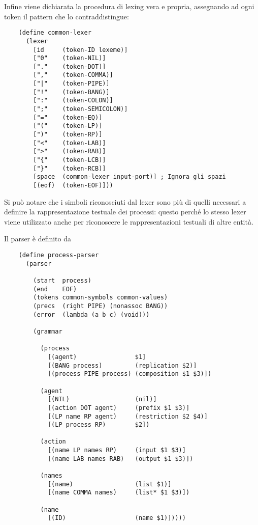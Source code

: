 Infine viene dichiarata la procedura di lexing vera e propria,
assegnando ad ogni token il pattern che lo contraddistingue:

\begin{lstlisting}
    (define common-lexer
      (lexer
        [id     (token-ID lexeme)]
        ["0"    (token-NIL)]
        ["."    (token-DOT)]
        [","    (token-COMMA)]
        ["|"    (token-PIPE)]
        ["!"    (token-BANG)]
        [":"    (token-COLON)]
        [";"    (token-SEMICOLON)]
        ["="    (token-EQ)]
        ["("    (token-LP)]
        [")"    (token-RP)]
        ["<"    (token-LAB)]
        [">"    (token-RAB)]
        ["{"    (token-LCB)]
        ["}"    (token-RCB)]
        [space  (common-lexer input-port)] ; Ignora gli spazi
        [(eof)  (token-EOF)]))
\end{lstlisting}

Si pu\`o notare che i simboli riconosciuti dal lexer sono pi\`u di
quelli necessari a definire la rappresentazione testuale dei processi:
questo perch\'e lo stesso lexer viene utilizzato anche per riconoscere
le rappresentazioni testuali di altre entit\`a.

Il parser \`e definito da

\begin{lstlisting}
    (define process-parser
      (parser

        (start  process)
        (end    EOF)
        (tokens common-symbols common-values)
        (precs  (right PIPE) (nonassoc BANG))
        (error  (lambda (a b c) (void)))

        (grammar

          (process
            [(agent)                $1]
            [(BANG process)         (replication $2)]
            [(process PIPE process) (composition $1 $3)])

          (agent
            [(NIL)                  (nil)]
            [(action DOT agent)     (prefix $1 $3)]
            [(LP name RP agent)     (restriction $2 $4)]
            [(LP process RP)        $2])

          (action
            [(name LP names RP)     (input $1 $3)]
            [(name LAB names RAB)   (output $1 $3)])

          (names
            [(name)                 (list $1)]
            [(name COMMA names)     (list* $1 $3)])

          (name
            [(ID)                   (name $1)]))))
\end{lstlisting}

